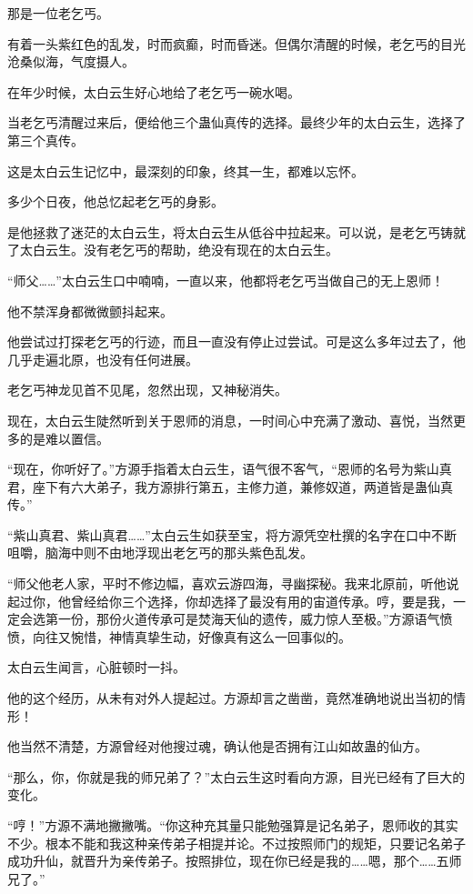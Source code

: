 \begin{this_body}
那是一位老乞丐。

有着一头紫红色的乱发，时而疯癫，时而昏迷。但偶尔清醒的时候，老乞丐的目光沧桑似海，气度摄人。

在年少时候，太白云生好心地给了老乞丐一碗水喝。

当老乞丐清醒过来后，便给他三个蛊仙真传的选择。最终少年的太白云生，选择了第三个真传。

这是太白云生记忆中，最深刻的印象，终其一生，都难以忘怀。

多少个日夜，他总忆起老乞丐的身影。

是他拯救了迷茫的太白云生，将太白云生从低谷中拉起来。可以说，是老乞丐铸就了太白云生。没有老乞丐的帮助，绝没有现在的太白云生。

“师父……”太白云生口中喃喃，一直以来，他都将老乞丐当做自己的无上恩师！

他不禁浑身都微微颤抖起来。

他尝试过打探老乞丐的行迹，而且一直没有停止过尝试。可是这么多年过去了，他几乎走遍北原，也没有任何进展。

老乞丐神龙见首不见尾，忽然出现，又神秘消失。

现在，太白云生陡然听到关于恩师的消息，一时间心中充满了激动、喜悦，当然更多的是难以置信。

“现在，你听好了。”方源手指着太白云生，语气很不客气，“恩师的名号为紫山真君，座下有六大弟子，我方源排行第五，主修力道，兼修奴道，两道皆是蛊仙真传。”

“紫山真君、紫山真君……”太白云生如获至宝，将方源凭空杜撰的名字在口中不断咀嚼，脑海中则不由地浮现出老乞丐的那头紫色乱发。

“师父他老人家，平时不修边幅，喜欢云游四海，寻幽探秘。我来北原前，听他说起过你，他曾经给你三个选择，你却选择了最没有用的宙道传承。哼，要是我，一定会选第一份，那份火道传承可是焚海天仙的遗传，威力惊人至极。”方源语气愤愤，向往又惋惜，神情真挚生动，好像真有这么一回事似的。

太白云生闻言，心脏顿时一抖。

他的这个经历，从未有对外人提起过。方源却言之凿凿，竟然准确地说出当初的情形！

他当然不清楚，方源曾经对他搜过魂，确认他是否拥有江山如故蛊的仙方。

“那么，你，你就是我的师兄弟了？”太白云生这时看向方源，目光已经有了巨大的变化。

“哼！”方源不满地撇撇嘴。“你这种充其量只能勉强算是记名弟子，恩师收的其实不少。根本不能和我这种亲传弟子相提并论。不过按照师门的规矩，只要记名弟子成功升仙，就晋升为亲传弟子。按照排位，现在你已经是我的……嗯，那个……五师兄了。”


\end{this_body}
